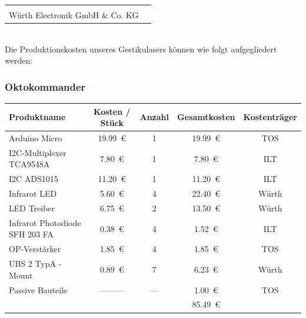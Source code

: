 \begin{tabularx}{\textwidth}{r c}
	\vspace{1.5cm} & \\
	Würth Electronik GmbH \& Co. KG & \noindent\parbox[c]{\hsize}{\includegraphics[scale=0.05]{../Logos/Wuerth.png}}
\end{tabularx} \\

\newpage
\noindent
Die Produktionskosten unseres Gestikulasers können wie folgt aufgegliedert werden:

\subsubsection*{Oktokommander} 
\begin{tabularx}{\textwidth}{p{4.5cm} | S c S c}
	Produktname		 				& {Kosten / Stück}	& Anzahl & {Gesamtkosten}	& Kostenträger \\ 
	\hline
	Arduino Micro 					& \SI{19.99}{€}		&   1    & \SI{19.99}{€} 	& TOS 	\\ [2mm]
	I2C-Multiplexer TCA9548A		& \SI{7.80}{€}   	&   1    & \SI{7.80}{€}  	& ILT    \\ [8mm]
	I2C ADS1015						& \SI{11.20}{€}  	&   1    & \SI{11.20}{€} 	& ILT    \\ [2mm]
	Infrarot LED    				& \SI{5.60}{€}		&   4    & \SI{22.40}{€} 	& Würth  \\ [2mm]
	LED Treiber     				& \SI{6.75}{€}    	&   2    & \SI{13.50}{€} 	& Würth  \\ [2mm]
	Infrarot Photodiode SFH 203 FA	& \SI{0.38}{€}		&   4    & \SI{1.52}{€}  	& ILT	\\ [8mm] 
	OP-Verstärker    				& \SI{1.85}{€}    	&	4    & \SI{1.85}{€}  	& TOS    \\ [2mm]
	UBS 2 TypA -Mount				& \SI{0.89}{€}    	&   7    & \SI{6.23}{€}  	& Würth  \\ [2mm]
	Passive Bauteile    			& {---------}    	& {---}  & \SI{1.00}{€}	   	& TOS    \\ [2mm]
	\hline
									&					&		 & \SI{85.49}{€} 	&
\end{tabularx}\\

